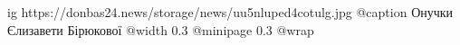  
 
 
 
 

\ifcmt
  ig https://donbas24.news/storage/news/uu5nluped4cotulg.jpg
	@caption Онучки Єлизавети Бірюкової
  @width 0.3
  @minipage 0.3
  @wrap \parpic[r]
\fi
